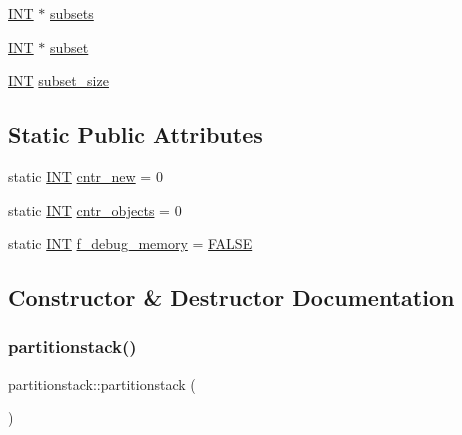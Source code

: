 \begin{DoxyCompactItemize}
\item 
\mbox{\hyperlink{galois_8h_a09fddde158a3a20bd2dcadb609de11dc}{I\+NT}} $\ast$ \mbox{\hyperlink{classpartitionstack_a8794938be66ccc79dad9629e654620ae}{subsets}}
\item 
\mbox{\hyperlink{galois_8h_a09fddde158a3a20bd2dcadb609de11dc}{I\+NT}} $\ast$ \mbox{\hyperlink{classpartitionstack_aa5b8c47bbd121effaf6ea192a50cd0e5}{subset}}
\item 
\mbox{\hyperlink{galois_8h_a09fddde158a3a20bd2dcadb609de11dc}{I\+NT}} \mbox{\hyperlink{classpartitionstack_a61f0c24f41a4784297847d70bb78c644}{subset\+\_\+size}}
\end{DoxyCompactItemize}
\subsection*{Static Public Attributes}
\begin{DoxyCompactItemize}
\item 
static \mbox{\hyperlink{galois_8h_a09fddde158a3a20bd2dcadb609de11dc}{I\+NT}} \mbox{\hyperlink{classpartitionstack_aaf965f8f3ece9ca67875d6c0a119d79b}{cntr\+\_\+new}} = 0
\item 
static \mbox{\hyperlink{galois_8h_a09fddde158a3a20bd2dcadb609de11dc}{I\+NT}} \mbox{\hyperlink{classpartitionstack_a946fd6e351ee637731f81c30e780a832}{cntr\+\_\+objects}} = 0
\item 
static \mbox{\hyperlink{galois_8h_a09fddde158a3a20bd2dcadb609de11dc}{I\+NT}} \mbox{\hyperlink{classpartitionstack_a9e3426bcbf62acd930e1a6d1306bb41d}{f\+\_\+debug\+\_\+memory}} = \mbox{\hyperlink{nauty_8h_aa93f0eb578d23995850d61f7d61c55c1}{F\+A\+L\+SE}}
\end{DoxyCompactItemize}


\subsection{Constructor \& Destructor Documentation}
\mbox{\label{classpartitionstack_ada34be40ca89f2091a241ba7e285eb45}} 
\subsubsection{\texorpdfstring{partitionstack()}{partitionstack()}}
{\footnotesize\ttfamily partitionstack\+::partitionstack (\begin{DoxyParamCaption}{ }\end{DoxyParamCaption})}

